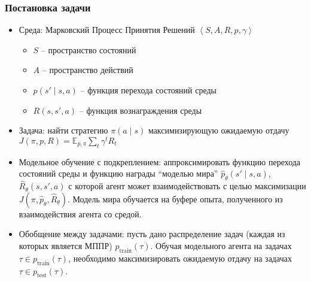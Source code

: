 \begin{frame}
\frametitle{Постановка задачи}
\begin{itemize}
    \item Среда: Марковский Процесс Принятия Решений $\left<S, A, R, p, \gamma\right>$
    \begin{itemize}
        \item $S$ -- пространство состояний
        \item $A$ -- пространство действий
        \item $p(s'\mid s, a)$ -- функция перехода состояний среды
        \item $R(s, s', a)$ -- функция вознаграждения среды
    \end{itemize}
    \item Задача: найти стратегию $\pi(a\mid s)$ максимизирующую ожидаемую отдачу $J(\pi, p, R) = \mathbb{E}_{p, \pi} \sum_t \gamma^t R_t$
    \item Модельное обучение с подкреплением: аппроксимировать функцию перехода состояний среды и функцию награды ``моделью мира'' $\hat{p}_{\theta}(s'\mid s, a)$, $\hat{R}_{\theta}(s, s', a)$ с которой агент может взаимодействовать с целью максимизации $J(\pi, \hat{p}_{\theta}, \hat{R}_{\theta})$. Модель мира обучается на буфере опыта, полученного из взаимодействия агента со средой.
    \item Обобщение между задачами: пусть дано распределение задач (каждая из которых является МППР) $p_{\text{train}}(\tau)$. Обучая модельного агента на задачах $\tau \in p_{\text{train}}(\tau)$, необходимо максимизировать ожидаемую отдачу на задачах $\tau \in p_{\text{test}}(\tau)$.
\end{itemize}
\end{frame}
